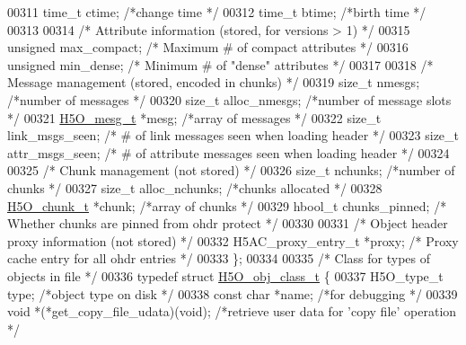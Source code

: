 \begin{DoxyCode}
00311     time\_t      ctime;                  \textcolor{comment}{/*change time                */}
00312     time\_t      btime;                  \textcolor{comment}{/*birth time                 */}
00313 
00314     \textcolor{comment}{/* Attribute information (stored, for versions > 1) */}
00315     \textcolor{keywordtype}{unsigned}    max\_compact;        \textcolor{comment}{/* Maximum # of compact attributes   */}
00316     \textcolor{keywordtype}{unsigned}    min\_dense;      \textcolor{comment}{/* Minimum # of "dense" attributes   */}
00317 
00318     \textcolor{comment}{/* Message management (stored, encoded in chunks) */}
00319     \textcolor{keywordtype}{size\_t}  nmesgs;         \textcolor{comment}{/*number of messages             */}
00320     \textcolor{keywordtype}{size\_t}  alloc\_nmesgs;       \textcolor{comment}{/*number of message slots        */}
00321     \hyperlink{struct_h5_o__mesg__t}{H5O\_mesg\_t}    *mesg;          \textcolor{comment}{/*array of messages          */}
00322     \textcolor{keywordtype}{size\_t}      link\_msgs\_seen;         \textcolor{comment}{/* # of link messages seen when loading header */}
00323     \textcolor{keywordtype}{size\_t}      attr\_msgs\_seen;         \textcolor{comment}{/* # of attribute messages seen when loading header */}
00324 
00325     \textcolor{comment}{/* Chunk management (not stored) */}
00326     \textcolor{keywordtype}{size\_t}  nchunks;        \textcolor{comment}{/*number of chunks           */}
00327     \textcolor{keywordtype}{size\_t}  alloc\_nchunks;      \textcolor{comment}{/*chunks allocated           */}
00328     \hyperlink{struct_h5_o__chunk__t}{H5O\_chunk\_t} *chunk;          \textcolor{comment}{/*array of chunks            */}
00329     hbool\_t     chunks\_pinned;          \textcolor{comment}{/* Whether chunks are pinned from ohdr protect */}
00330 
00331     \textcolor{comment}{/* Object header proxy information (not stored) */}
00332     H5AC\_proxy\_entry\_t *proxy;          \textcolor{comment}{/* Proxy cache entry for all ohdr entries */}
00333 \};
00334 
00335 \textcolor{comment}{/* Class for types of objects in file */}
00336 \textcolor{keyword}{typedef} \textcolor{keyword}{struct }\hyperlink{struct_h5_o__obj__class__t}{H5O\_obj\_class\_t} \{
00337     H5O\_type\_t  type;               \textcolor{comment}{/*object type on disk        */}
00338     \textcolor{keyword}{const} \textcolor{keywordtype}{char}  *name;              \textcolor{comment}{/*for debugging          */}
00339     \textcolor{keywordtype}{void}       *(*get\_copy\_file\_udata)(void);   \textcolor{comment}{/*retrieve user data for 'copy file' operation */}

\end{DoxyCode}
